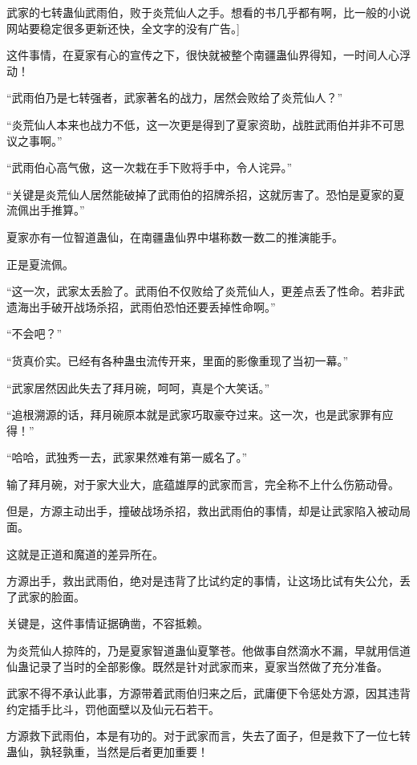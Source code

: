 
\begin{this_body}

武家的七转蛊仙武雨伯，败于炎荒仙人之手。想看的书几乎都有啊，比一般的小说网站要稳定很多更新还快，全文字的没有广告。]

这件事情，在夏家有心的宣传之下，很快就被整个南疆蛊仙界得知，一时间人心浮动！

“武雨伯乃是七转强者，武家著名的战力，居然会败给了炎荒仙人？”

“炎荒仙人本来也战力不低，这一次更是得到了夏家资助，战胜武雨伯并非不可思议之事啊。”

“武雨伯心高气傲，这一次栽在手下败将手中，令人诧异。”

“关键是炎荒仙人居然能破掉了武雨伯的招牌杀招，这就厉害了。恐怕是夏家的夏流佩出手推算。”

夏家亦有一位智道蛊仙，在南疆蛊仙界中堪称数一数二的推演能手。

正是夏流佩。

“这一次，武家太丢脸了。武雨伯不仅败给了炎荒仙人，更差点丢了性命。若非武遗海出手破开战场杀招，武雨伯恐怕还要丢掉性命啊。”

“不会吧？”

“货真价实。已经有各种蛊虫流传开来，里面的影像重现了当初一幕。”

“武家居然因此失去了拜月碗，呵呵，真是个大笑话。”

“追根溯源的话，拜月碗原本就是武家巧取豪夺过来。这一次，也是武家罪有应得！”

“哈哈，武独秀一去，武家果然难有第一威名了。”

输了拜月碗，对于家大业大，底蕴雄厚的武家而言，完全称不上什么伤筋动骨。

但是，方源主动出手，撞破战场杀招，救出武雨伯的事情，却是让武家陷入被动局面。

这就是正道和魔道的差异所在。

方源出手，救出武雨伯，绝对是违背了比试约定的事情，让这场比试有失公允，丢了武家的脸面。

关键是，这件事情证据确凿，不容抵赖。

为炎荒仙人掠阵的，乃是夏家智道蛊仙夏擎苍。他做事自然滴水不漏，早就用信道仙蛊记录了当时的全部影像。既然是针对武家而来，夏家当然做了充分准备。

武家不得不承认此事，方源带着武雨伯归来之后，武庸便下令惩处方源，因其违背约定插手比斗，罚他面壁以及仙元石若干。

方源救下武雨伯，本是有功的。对于武家而言，失去了面子，但是救下了一位七转蛊仙，孰轻孰重，当然是后者更加重要！


\end{this_body}
